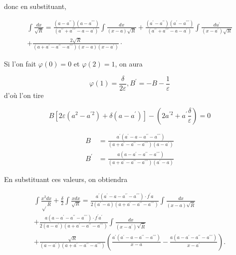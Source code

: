 \documentclass{article}
\begin{document}
donc en substituant,

\[
\begin{gathered}
\int \frac{d x}{\sqrt{R}}=\frac{\left(a-a^{\prime \prime}\right)\left(a-a^{\prime \prime \prime}\right)}{\left(a^{\prime \prime}+a^{\prime \prime \prime}-a-a^{\prime}\right)} \int \frac{d x}{(x-a) \sqrt{R}}+\frac{\left(a^{\prime}-a^{\prime \prime}\right)\left(a^{\prime}-a^{\prime \prime \prime}\right)}{\left(a^{\prime \prime}+a^{\prime \prime \prime}-a-a^{\prime}\right)} \int \frac{d u^{\prime}}{\left(x-a^{\prime}\right) \sqrt{R}} \\
+\frac{2 \sqrt{R}}{\left(a+a^{\prime}-a^{\prime \prime}-a^{\prime \prime \prime}\right)(x-a)\left(x-a^{\prime}\right)} \cdot
\end{gathered}
\]

Si l'on fait \(\varphi(0)=0\) et \(\varphi(2)=1\), on aura

\[
\varphi(1)=\frac{\delta}{2 \varepsilon}, B^{\prime}=-B-\frac{1}{\varepsilon}
\]
d'où l'on tire

\[
B\left[2 \varepsilon\left(a^{2}-a^{\prime 2}\right)+\delta\left(a-a^{\prime}\right)\right]-\left(2 a^{\prime 2}+a^{\prime} \frac{\delta}{\varepsilon}\right)=0
\]

\[
\begin{aligned}
B & =\frac{a^{\prime}\left(a^{\prime}-a-a^{\prime \prime}-a^{\prime \prime \prime}\right)}{\left(a+a^{\prime}-a^{\prime \prime}-a^{\prime \prime \prime}\right)\left(a-a^{\prime}\right)} \\
B^{\prime} & =\frac{a\left(a-a^{\prime}-a^{\prime \prime}-a^{\prime \prime \prime}\right)}{\left(a+a^{\prime}-a^{\prime \prime}-a^{\prime \prime \prime}\right)\left(a^{\prime}-a\right)}
\end{aligned}
\]

En substituant ces valeurs, on obtiendra

\[
\begin{gathered}
\int \frac{x^{2} d x}{\sqrt{ } \bar{R}}+\frac{\delta}{2} \int \frac{x d x}{\sqrt{R}}=\frac{a^{\prime}\left(a^{\prime}-a-a^{\prime \prime}-a^{\prime \prime \prime}\right) \cdot f^{\prime} a}{2\left(a^{\prime}-a\right)\left(a+a^{\prime}-a^{\prime \prime}-a^{\prime \prime \prime}\right)} \int \frac{d x}{(x-a) \sqrt{\bar{R}}} \\
+\frac{a\left(a-a^{\prime}-a^{\prime \prime}-a^{\prime \prime \prime}\right) \cdot f^{\prime} a^{\prime}}{2\left(a-a^{\prime}\right)\left(a+a^{\prime}-a^{\prime \prime}-a^{\prime \prime \prime}\right)} \int \frac{d x}{\left(x-a^{\prime}\right) \sqrt{\bar{R}}} \\
+\frac{\sqrt{R}}{\left(a-a^{\prime}\right)\left(a+a^{\prime}-a^{\prime \prime}-a^{\prime \prime \prime}\right)}\left(\frac{a^{\prime}\left(a^{\prime}-a-a^{\prime \prime}-a^{\prime \prime \prime}\right)}{x-a}-\frac{a\left(a-a^{\prime}-a^{\prime \prime}-a^{\prime \prime \prime}\right)}{x-a^{\prime}}\right) .
\end{gathered}
\]
\end{document}
